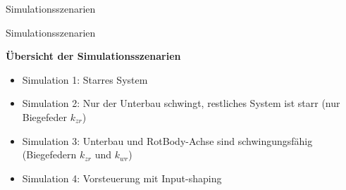 \documentclass[10pt,xcolor=dvipsnames]{beamer}
\begin{document}
\begin{frame}{Simulationsszenarien}
\begin{minipage}{0.39\textwidth}
\begin{figure}
			\end{figure}
		\end{minipage}
	\end{frame}

	\begin{frame}{Simulationsszenarien}
		\begin{minipage}{0.58\textwidth}
			\textbf{Übersicht der Simulationsszenarien}
			\begin{itemize}
				\item \textcolor{blue!60!black}{Simulation 1:} Starres System
				\item \textcolor{blue!60!black}{Simulation 2:} Nur der Unterbau schwingt, restliches System ist starr (nur Biegefeder $ k_{zr} $)
				\item \textcolor{blue!60!black}{Simulation 3:} Unterbau und RotBody-Achse sind schwingungsfähig (Biegefedern $ k_{zr} $ und $ k_{wr} $)
				\item \textcolor{blue!60!black}{Simulation 4:} Vorsteuerung mit Input-shaping	
		\end{itemize}
		\end{minipage}
		\hfill
		\begin{minipage}{0.38\textwidth}
			\begin{figure}

\end{figure}
\end{minipage}
\end{frame}
\end{document}
